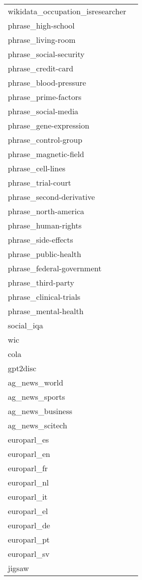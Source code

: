 \begin{table}[!ht]
\begin{tabular}{|l|l|}
wikidata\_occupation\_isresearcher & \\ \cline{1-1}
phrase\_high-school & \\ \cline{1-1}
phrase\_living-room & \\ \cline{1-1}
phrase\_social-security & \\ \cline{1-1}
phrase\_credit-card & \\ \cline{1-1}
phrase\_blood-pressure & \\ \cline{1-1}
phrase\_prime-factors & \\ \cline{1-1}
phrase\_social-media & \\ \cline{1-1}
phrase\_gene-expression & \\ \cline{1-1}
phrase\_control-group & \\ \cline{1-1}
phrase\_magnetic-field & \\ \cline{1-1}
phrase\_cell-lines & \\ \cline{1-1}
phrase\_trial-court & \\ \cline{1-1}
phrase\_second-derivative & \\ \cline{1-1}
phrase\_north-america & \\ \cline{1-1}
phrase\_human-rights & \\ \cline{1-1}
phrase\_side-effects & \\ \cline{1-1}
phrase\_public-health & \\ \cline{1-1}
phrase\_federal-government & \\ \cline{1-1}
phrase\_third-party & \\ \cline{1-1}
phrase\_clinical-trials & \\ \cline{1-1}
phrase\_mental-health & \\ \hline
social\_iqa &  \citet{sap2019socialiqa}  \\ \hline
wic & \multirow{2}{*}{\citet{wang2018glue}} \\ \cline{1-1}
cola & \\ \hline
gpt2disc & \citet{gpt2_output_dataset} \\ \hline
ag\_news\_world & \multirow{4}{*}{\citet{gulli_ag_news}} \\ \cline{1-1}
ag\_news\_sports & \\ \cline{1-1}
ag\_news\_business & \\ \cline{1-1}
ag\_news\_scitech & \\ \hline
europarl\_es & \multirow{8}{*}{\citet{koehn-2005-europarl}} \\ \cline{1-1}
europarl\_en & \\ \cline{1-1}
europarl\_fr & \\ \cline{1-1}
europarl\_nl & \\ \cline{1-1}
europarl\_it & \\ \cline{1-1}
europarl\_el & \\ \cline{1-1}
europarl\_de & \\ \cline{1-1}
europarl\_pt & \\ \cline{1-1}
europarl\_sv & \\ \hline
jigsaw & \citet{jigsaw2017} \\ \hline
\end{tabular}
\end{table}

